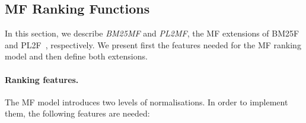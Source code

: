 %  		
%  		
%	  	

\subsection{MF Ranking Functions}
\label{sec:mf-function}

In this section, we describe \emph{BM25MF} and \emph{PL2MF}, the MF extensions of BM25F~\cite{zaragoza:2004:microsoft} and PL2F~\cite{macdonald:2005:clef}, respectively.
We present first the features needed for the MF ranking model and then define both extensions.

\paragraph{Ranking features.}

The MF model introduces two levels of normalisations. In order to implement them, the following features are needed:

